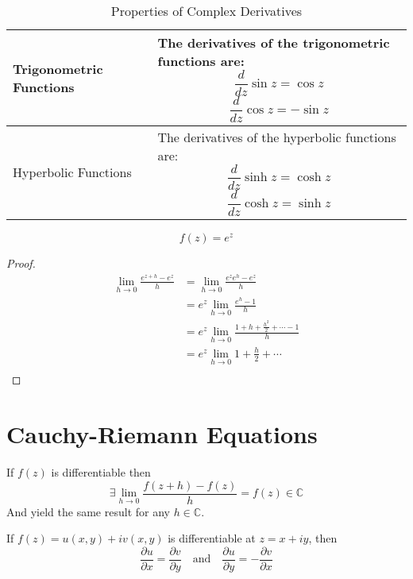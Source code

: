 \begin{table}[htbp]
\begin{tabular}{| m{5cm} | m{9cm} |}
        \hline
        Trigonometric Functions & The derivatives of the trigonometric functions are: \[ \frac{d}{dz} \sin z = \cos z \] \[ \frac{d}{dz} \cos z = -\sin z \]                                                                         \\
        \hline
        Hyperbolic Functions    & The derivatives of the hyperbolic functions are: \[ \frac{d}{dz} \sinh z = \cosh z \] \[ \frac{d}{dz} \cosh z = \sinh z \]                                                                         \\
        \hline
    \end{tabular}
    \caption{Properties of Complex Derivatives}
    \label{table:complex_derivative_properties}
\end{table}

\begin{example}
    $$f(z) = e^z$$
\end{example}

\begin{proof}
    \begin{align*}
        \lim_{h \to 0} \frac{e^{z + h} - e^z}{h} & = \lim_{h \to 0} \frac{e^z e^h - e^z}{h}                          \\
                                                 & = e^z \lim_{h \to 0} \frac{e^h - 1}{h}                            \\
                                                 & = e^z \lim_{h \to 0} \frac{1 + h + \frac{h^2}{2} + \cdots - 1}{h} \\
                                                 & = e^z \lim_{h \to 0} 1 + \frac{h}{2} + \cdots                     \\
    \end{align*}
\end{proof}

\section{Cauchy-Riemann Equations}
\begin{lemma}
    If $f(z)$ is differentiable then $$\exists\lim_{h \to 0} \frac{f(z + h) - f(z)}{h} = f(z) \in \mathbb{C}$$
    And yield the same result for any $h \in \mathbb{C}$.
\end{lemma}


\begin{theorem}
    If $f(z) = u(x,y) + iv(x,y)$ is differentiable at $z = x + iy$, then
    $$\frac{\partial u}{\partial x} = \frac{\partial v}{\partial y} \quad \text{and} \quad \frac{\partial u}{\partial y} = -\frac{\partial v}{\partial x}$$
\end{theorem}



